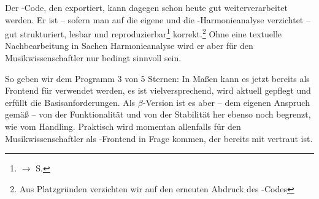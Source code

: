 Der -Code, den  exportiert, kann dagegen schon heute
gut weiterverarbeitet werden. Er ist -- sofern man auf die eigene und die
-Harmonieanalyse verzichtet -- gut strukturiert, lesbar und
reproduzierbar\footnote{$\rightarrow$ S.\pageref{ExportVerifikation}}
korrekt.\footnote{Aus Platzgründen verzichten wir auf den erneuten Abdruck des
-Codes} Ohne eine textuelle Nachbearbeitung in Sachen
Harmonieanalyse wird er aber für den Musikwissenschaftler nur bedingt sinnvoll
sein.

So geben wir dem Programm 3 von 5 Sternen: In Maßen kann es jetzt bereits als
Frontend für  verwendet werden, es ist vielversprechend, wird
aktuell gepflegt und erfüllt die Basisanforderungen. Als $\beta$-Version ist es
aber -- dem eigenen Anspruch gemäß -- von der Funktionalität und von der
Stabilität her ebenso noch begrenzt, wie vom Handling. Praktisch wird
 momentan allenfalls für den Musikwissenschaftler als
-Frontend in Frage kommen, der bereits mit  vertraut
ist.


%
